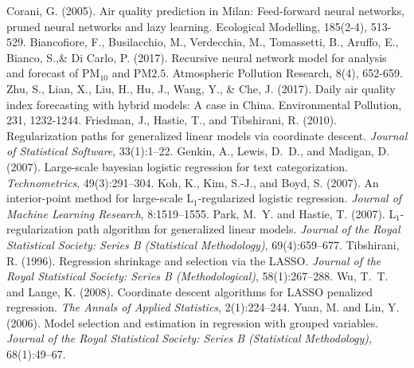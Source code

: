 \documentclass{book}
\numberwithin{equation}{section}
\numberwithin{figure}{section}
\begin{document}
\begin{thebibliography}{99}
    Corani, G. (2005). Air quality prediction in Milan: Feed-forward neural networks, pruned neural networks and lazy learning. Ecological Modelling, 185(2-4), 513-529.
    Biancofiore, F., Busilacchio, M., Verdecchia, M., Tomassetti, B., Aruffo, E., Bianco, S.,\& Di Carlo, P. (2017). Recursive neural network model for analysis and forecast of PM$_{10}$ and PM${2.5}$. Atmospheric Pollution Research, 8(4), 652-659.
    Zhu, S., Lian, X., Liu, H., Hu, J., Wang, Y., \& Che, J. (2017). Daily air quality index forecasting with hybrid models: A case in China. Environmental Pollution, 231, 1232-1244.
    Friedman, J., Hastie, T., and Tibshirani, R. (2010).
    \newblock Regularization paths for generalized linear models via coordinate descent.
    \newblock \emph{Journal of Statistical Software}, 33(1):1--22.
    Genkin, A., Lewis, D.~D., and Madigan, D. (2007).
    \newblock Large-scale bayesian logistic regression for text categorization.
    \newblock \emph{Technometrics}, 49(3):291--304.
    Koh, K., Kim, S.-J., and Boyd, S. (2007).
    \newblock An interior-point method for large-scale L$_1$-regularized logistic regression.
    \newblock \emph{Journal of Machine Learning Research}, 8:1519--1555.
    Park, M.~Y. and Hastie, T. (2007).
    \newblock L$_1$-regularization path algorithm for generalized linear models.
    \newblock \emph{Journal of the Royal Statistical Society: Series B (Statistical Methodology)}, 69(4):659--677.
    Tibshirani, R. (1996).
    \newblock Regression shrinkage and selection via the LASSO.
    \newblock \emph{Journal of the Royal Statistical Society: Series B (Methodological)}, 58(1):267--288.
    Wu, T.~T. and Lange, K. (2008).
    \newblock Coordinate descent algorithms for LASSO penalized regression.
    \newblock \emph{The Annals of Applied Statistics}, 2(1):224--244.
    Yuan, M. and Lin, Y. (2006).
    \newblock Model selection and estimation in regression with grouped variables.
    \newblock \emph{Journal of the Royal Statistical Society: Series B (Statistical Methodology)}, 68(1):49--67.

\end{thebibliography}
\end{document}
